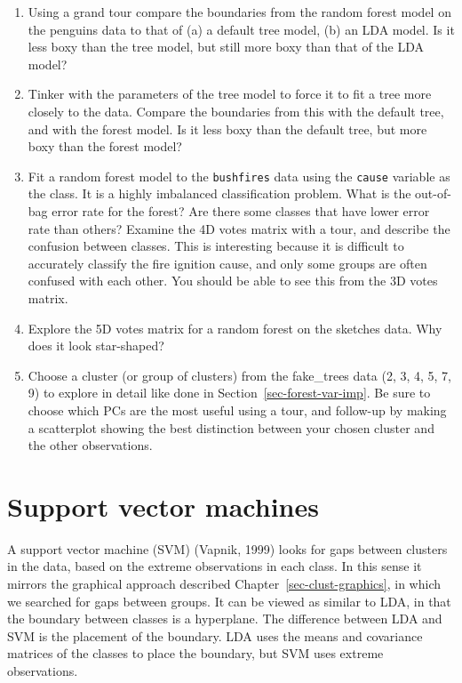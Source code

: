 \documentclass[
  letterpaper,
]{book}
\providecommand{\tightlist}{%
  \setlength{\itemsep}{0pt}\setlength{\parskip}{0pt}}\usepackage{longtable,booktabs,array}
\begin{document}
\begin{enumerate}
\def\labelenumi{\arabic{enumi}.}
\tightlist
\item
  Using a grand tour compare the boundaries from the random forest model
  on the penguins data to that of (a) a default tree model, (b) an LDA
  model. Is it less boxy than the tree model, but still more boxy than
  that of the LDA model?
\item
  Tinker with the parameters of the tree model to force it to fit a tree
  more closely to the data. Compare the boundaries from this with the
  default tree, and with the forest model. Is it less boxy than the
  default tree, but more boxy than the forest model?
\item
  Fit a random forest model to the \texttt{bushfires} data using the
  \texttt{cause} variable as the class. It is a highly imbalanced
  classification problem. What is the out-of-bag error rate for the
  forest? Are there some classes that have lower error rate than others?
  Examine the 4D votes matrix with a tour, and describe the confusion
  between classes. This is interesting because it is difficult to
  accurately classify the fire ignition cause, and only some groups are
  often confused with each other. You should be able to see this from
  the 3D votes matrix.
\item
  Explore the 5D votes matrix for a random forest on the sketches data.
  Why does it look star-shaped?
\item
  Choose a cluster (or group of clusters) from the fake\_trees data (2,
  3, 4, 5, 7, 9) to explore in detail like done in
  Section~\ref{sec-forest-var-imp}. Be sure to choose which PCs are the
  most useful using a tour, and follow-up by making a scatterplot
  showing the best distinction between your chosen cluster and the other
  observations.
\end{enumerate}

\hypertarget{support-vector-machines}{%
\chapter{Support vector machines}\label{support-vector-machines}}


A support vector machine (SVM) (Vapnik, 1999) looks for gaps between
clusters in the data, based on the extreme observations in each class.
In this sense it mirrors the graphical approach described
Chapter~\ref{sec-clust-graphics}, in which we searched for gaps between
groups. It can be viewed as similar to LDA, in that the boundary between
classes is a hyperplane. The difference between LDA and SVM is the
placement of the boundary. LDA uses the means and covariance matrices of
the classes to place the boundary, but SVM uses extreme observations.
\end{document}
